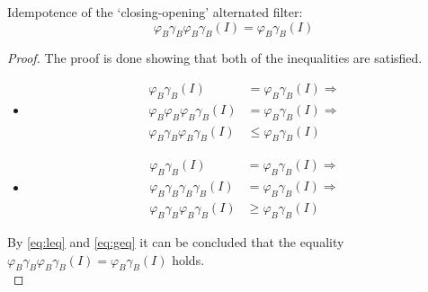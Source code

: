 \begin{thm}
    Idempotence of the `closing-opening' alternated filter:
    $$
    \varphi_B\gamma_B\varphi_B\gamma_B(I) = \varphi_B\gamma_B(I)
    $$

    \begin{proof}
        The proof is done showing that both of the inequalities are satisfied.
        \begin{itemize}
            \item[]
            \noindent{}
            \begin{equation}
            \begin{aligned}
                \varphi_B\gamma_B(I) &= \varphi_B\gamma_B(I) \Rightarrow \\
                \varphi_B\varphi_B\varphi_B\gamma_B(I) &= \varphi_B\gamma_B(I) \Rightarrow \\
                \varphi_B\gamma_B\varphi_B\gamma_B(I) &\leq \varphi_B\gamma_B(I)
            \end{aligned}
            \label{eq:leq}
            \end{equation}
            \item[]
            \noindent{}
            \begin{equation}
            \begin{aligned}
                \varphi_B\gamma_B(I) &= \varphi_B\gamma_B(I) \Rightarrow \\
                \varphi_B\gamma_B\gamma_B\gamma_B(I) &= \varphi_B\gamma_B(I) \Rightarrow \\
                \varphi_B\gamma_B\varphi_B\gamma_B(I) &\geq \varphi_B\gamma_B(I)
            \end{aligned}
            \label{eq:geq}
            \end{equation}
        \end{itemize}
        By \eqref{eq:leq} and \eqref{eq:geq} it can be concluded that the equality $\varphi_B\gamma_B\varphi_B\gamma_B(I) = \varphi_B\gamma_B(I)$ holds. \\
    \end{proof}
\end{thm}
